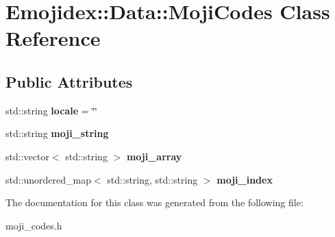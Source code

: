 \hypertarget{classEmojidex_1_1Data_1_1MojiCodes}{}\section{Emojidex\+:\+:Data\+:\+:Moji\+Codes Class Reference}
\label{classEmojidex_1_1Data_1_1MojiCodes}
\subsection*{Public Attributes}
\begin{DoxyCompactItemize}
\item 
std\+::string {\bfseries locale} = \char`\"{}\char`\"{}\hypertarget{classEmojidex_1_1Data_1_1MojiCodes_a30264352b96dfd99ff288c1669a999cc}{}\label{classEmojidex_1_1Data_1_1MojiCodes_a30264352b96dfd99ff288c1669a999cc}

\item 
std\+::string {\bfseries moji\+\_\+string}\hypertarget{classEmojidex_1_1Data_1_1MojiCodes_af3d498cd68c0dad96394096631a871ce}{}\label{classEmojidex_1_1Data_1_1MojiCodes_af3d498cd68c0dad96394096631a871ce}

\item 
std\+::vector$<$ std\+::string $>$ {\bfseries moji\+\_\+array}\hypertarget{classEmojidex_1_1Data_1_1MojiCodes_a0847d05256542ad50fa8f3b48bf76853}{}\label{classEmojidex_1_1Data_1_1MojiCodes_a0847d05256542ad50fa8f3b48bf76853}

\item 
std\+::unordered\+\_\+map$<$ std\+::string, std\+::string $>$ {\bfseries moji\+\_\+index}\hypertarget{classEmojidex_1_1Data_1_1MojiCodes_adaa77850c0d3d456c268a15e0f92e3ec}{}\label{classEmojidex_1_1Data_1_1MojiCodes_adaa77850c0d3d456c268a15e0f92e3ec}

\end{DoxyCompactItemize}


The documentation for this class was generated from the following file\+:\begin{DoxyCompactItemize}
\item 
moji\+\_\+codes.\+h\end{DoxyCompactItemize}
